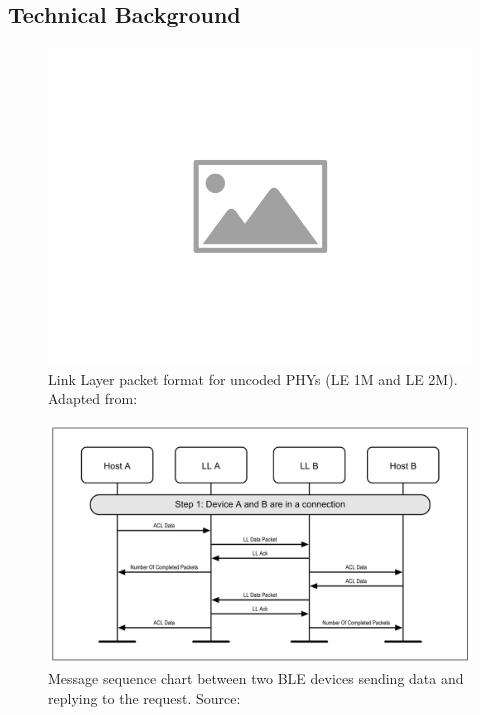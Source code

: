 \subsection{Technical Background} 


\begin{figure}[H]
    \centering
    \includegraphics[width=0.5\linewidth]{images/placeholder-image.png}
    \caption[Link Layer packet format for uncoded \acs{PHY}s (LE 1M and LE 2M).]{Link Layer packet format for uncoded \acs{PHY}s (LE 1M and LE 2M). Adapted from: \cite{Specification1999}}
    \label{fig:ble-ll-packet-format}
\end{figure}

\begin{figure}[H]
    \centering
    \includegraphics[width=\linewidth]{images/ble-sending-data.PNG}
    \caption[Message sequence chart between two \acs{BLE} devices sending data and replying to the request.]{Message sequence chart between two \acs{BLE} devices sending data and replying to the request. Source: \cite{Specification1999}}
    \label{fig:ble-message-sequence-chart}

\end{figure}


